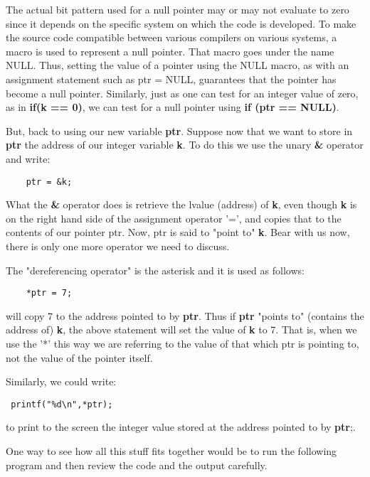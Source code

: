 The actual bit pattern used for a null pointer may or may not evaluate
to zero since it depends on the specific system on which the code is
developed. To make the source code compatible between various compilers
on various systems, a macro is used to represent a null pointer. That
macro goes under the name NULL. Thus, setting the value of a pointer
using the NULL macro, as with an assignment statement such as ptr =
NULL, guarantees that the pointer has become a null pointer. Similarly,
just as one can test for an integer value of zero, as in \textbf{if(k ==
0)}, we can test for a null pointer using \textbf{if (ptr == NULL)}.

But, back to using our new variable \textbf{ptr}. Suppose now that we
want to store in \textbf{ptr} the address of our integer variable
\textbf{k}. To do this we use the unary \textbf{\&} operator and write:

\begin{verbatim}
    ptr = &k; 
\end{verbatim}

What the \textbf{\&} operator does is retrieve the lvalue (address) of
\textbf{k}, even though \textbf{k} is on the right hand side of the
assignment operator '=', and copies that to the contents of our pointer
ptr. Now, ptr is said to "point to" \textbf{k}. Bear with us now, there
is only one more operator we need to discuss.

The "dereferencing operator" is the asterisk and it is used as follows:

\begin{verbatim}
    *ptr = 7; 
\end{verbatim}

will copy 7 to the address pointed to by \textbf{ptr}. Thus if
\textbf{ptr} "points to" (contains the address of) \textbf{k}, the above
statement will set the value of \textbf{k} to 7. That is, when we use
the '*' this way we are referring to the value of that which ptr is
pointing to, not the value of the pointer itself.

Similarly, we could write:

\begin{verbatim}
 printf("%d\n",*ptr); 
\end{verbatim}

to print to the screen the integer value stored at the address pointed
to by \textbf{ptr};.

One way to see how all this stuff fits together would be to run the
following program and then review the code and the output carefully.


